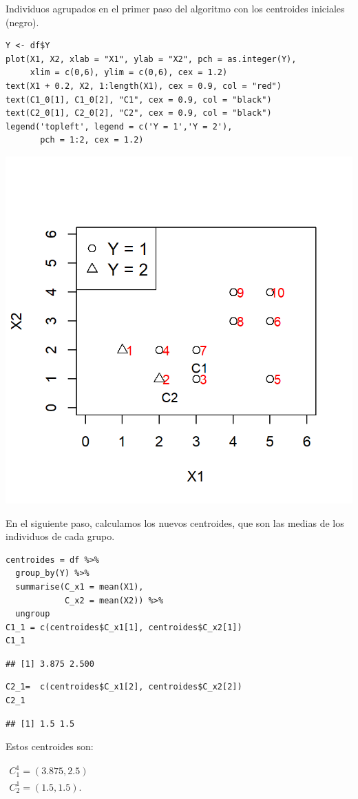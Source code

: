 Individuos agrupados en el primer paso del algoritmo  con los centroides iniciales (negro).
\begin{lstlisting}
Y <- df$Y
plot(X1, X2, xlab = "X1", ylab = "X2", pch = as.integer(Y), 
     xlim = c(0,6), ylim = c(0,6), cex = 1.2)
text(X1 + 0.2, X2, 1:length(X1), cex = 0.9, col = "red")
text(C1_0[1], C1_0[2], "C1", cex = 0.9, col = "black")
text(C2_0[1], C2_0[2], "C2", cex = 0.9, col = "black")
legend('topleft', legend = c('Y = 1','Y = 2'), 
       pch = 1:2, cex = 1.2)
\end{lstlisting}
\begin{center}
\includegraphics[width=0.5\linewidth]{"Temas/Imágenes/Tema 6/screenshot002"}
\end{center}
En el siguiente paso, calculamos los nuevos centroides, que son las medias de los individuos de cada grupo.
\begin{lstlisting}
centroides = df %>% 
  group_by(Y) %>%
  summarise(C_x1 = mean(X1),
            C_x2 = mean(X2)) %>%
  ungroup
C1_1 = c(centroides$C_x1[1], centroides$C_x2[1])
C1_1
\end{lstlisting}
\begin{verbatim}
## [1] 3.875 2.500
\end{verbatim}
\begin{lstlisting}
C2_1=  c(centroides$C_x1[2], centroides$C_x2[2])
C2_1
\end{lstlisting}
\begin{verbatim}
## [1] 1.5 1.5
\end{verbatim}
Estos centroides son: 

$\begin{array}{l}
C_1^1=(3.875,2.5)\\
C_2^1=(1.5,1.5).
\end{array}$


